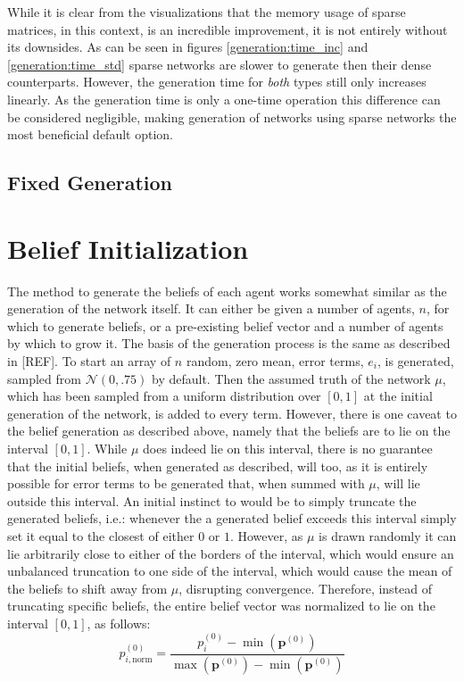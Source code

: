 \documentclass{article}
\newcommand{\beli}[3][2]{p_{#2}^{(#3)}}
\begin{document}
\newpage

While it is clear from the visualizations that the memory usage of sparse matrices, in this context, is an incredible improvement, it is not entirely without its downsides. As can be seen in figures \ref{generation:time_inc} and \ref{generation:time_std} sparse networks are slower to generate then their dense counterparts. However, the generation time for \emph{both} types still only increases linearly. As the generation time is only a one-time operation this difference can be considered negligible, making generation of networks using sparse networks the most beneficial default option.

\subsection{Fixed Generation}

\section{Belief Initialization}

The method to generate the beliefs of each agent works somewhat similar as the generation of the network itself. It can either be given a number of agents, $n$, for which to generate beliefs, or a pre-existing belief vector and a number of agents by which to grow it. The basis of the generation process is the same as described in [REF]. \newline
To start an array of $n$ random, zero mean, error terms, $e_i$, is generated, sampled from $\mathcal{N}(0, .75)$ by default. Then the assumed truth of the network $\mu$, which has been sampled from a uniform distribution over $[0, 1]$ at the initial generation of the network, is added to every term. \newline
However, there is one caveat to the belief generation as described above, namely that the beliefs are to lie on the interval $[0, 1]$. While $\mu$ does indeed lie on this interval, there is no guarantee that the initial beliefs, when generated as described, will too, as it is entirely possible for error terms to be generated that, when summed with $\mu$, will lie outside this interval. \newline
An initial instinct to would be to simply truncate the generated beliefs, i.e.: whenever the a generated belief exceeds this interval simply set it equal to the closest of either $0$ or $1$. However, as $\mu$ is drawn randomly it can lie arbitrarily close to either of the borders of the interval, which would ensure an unbalanced truncation to one side of the interval, which would cause the mean of the beliefs to shift away from $\mu$, disrupting convergence.\newline
Therefore, instead of truncating specific beliefs, the entire belief vector was normalized to lie on the interval $[0, 1]$, as follows:
\begin{equation*}
    \beli{i, \text{norm}}{0} = \frac{\beli{i}{0} - \min(\textbf{p}^{(0)})}{\max(\textbf{p}^{(0)}) - \min(\textbf{p}^{(0)})}
\end{equation*}
\end{document}
